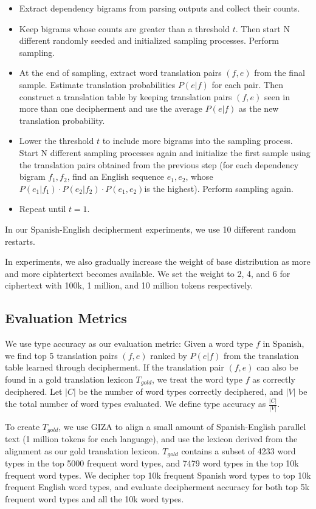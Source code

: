  \begin{itemize}
  \item Extract dependency bigrams from parsing outputs and collect their counts.
  \item Keep bigrams whose counts are greater than a threshold $t$. Then start N different randomly seeded and initialized sampling processes. Perform sampling.
  \item At the end of sampling, extract word translation pairs $(f,e)$ from the final sample. Estimate translation probabilities $P(e|f)$  for each pair. Then construct a translation table by keeping translation pairs $(f,e)$ seen in more than one decipherment and use the average $P(e|f)$ as the new translation probability.
  \item Lower the threshold $t$ to include more bigrams into the sampling process. Start N different sampling processes again and initialize the first sample using the translation pairs obtained from the previous step (for each dependency bigram $f_{1},f_{2}$, find an English sequence $e_{1},e_{2}$, whose $P(e_{1}|f_{1})\cdot P(e_{2}|f_{2})\cdot P(e_{1},e_{2})$is the highest). Perform sampling again.
  \item Repeat until $t=1$.
\end{itemize}

In our Spanish-English decipherment experiments, we use 10 different random restarts. 

In experiments, we also gradually increase the weight of base distribution as more and more ciphtertext becomes available. We set the weight to 2, 4, and 6 for ciphertext with 100k, 1 million, and 10 million tokens respectively. 

\subsection{Evaluation Metrics}
We use type accuracy as our evaluation metric: Given a word type $f$ in Spanish, we find top 5 translation pairs $(f,e)$ ranked by $P(e|f)$ from the translation table learned through decipherment. If the translation pair $(f,e)$ can also be found in a gold translation lexicon $T_{gold}$, we treat the word type $f$ as correctly deciphered. Let $|C|$ be the number of word types correctly deciphered, and $|V|$ be the total number of word types evaluated. We define type accuracy as $\frac{|C|}{|V|}$.

To create $T_{gold}$, we use GIZA to align a small amount of Spanish-English parallel text (1 million tokens for each language), and use the lexicon derived from the alignment as our gold translation lexicon. $T_{gold}$ contains a subset of 4233 word types in the top 5000 frequent word types, and 7479 word types in the top 10k frequent word types. We decipher top 10k frequent Spanish word types to top 10k frequent English word types, and evaluate decipherment accuracy for both top 5k frequent word types and all the 10k word types.

